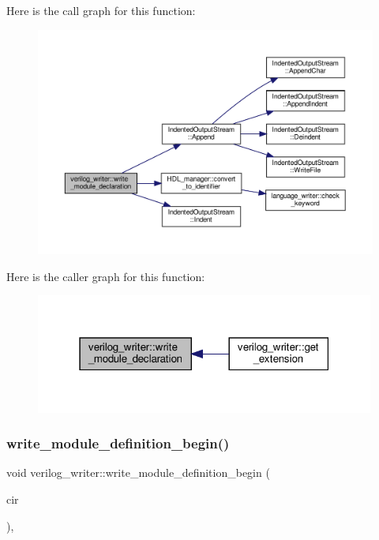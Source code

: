 Here is the call graph for this function\+:
\nopagebreak
\begin{figure}[H]
\begin{center}
\leavevmode
\includegraphics[width=350pt]{d8/dba/classverilog__writer_a1acf62504aefe5c48d6257cf707b59c3_cgraph}
\end{center}
\end{figure}
Here is the caller graph for this function\+:
\nopagebreak
\begin{figure}[H]
\begin{center}
\leavevmode
\includegraphics[width=316pt]{d8/dba/classverilog__writer_a1acf62504aefe5c48d6257cf707b59c3_icgraph}
\end{center}
\end{figure}
\mbox{\label{classverilog__writer_a8c7225cfbd24b813da3fc7a790ff1e1c}} 
\subsubsection{\texorpdfstring{write\+\_\+module\+\_\+definition\+\_\+begin()}{write\_module\_definition\_begin()}}
{\footnotesize\ttfamily void verilog\+\_\+writer\+::write\+\_\+module\+\_\+definition\+\_\+begin (\begin{DoxyParamCaption}\item[{const \hyperlink{structural__objects_8hpp_a8ea5f8cc50ab8f4c31e2751074ff60b2}{structural\+\_\+object\+Ref} \&}]{cir }\end{DoxyParamCaption})\hspace{0.3cm}{\ttfamily [override]}, {\ttfamily [virtual]}}



